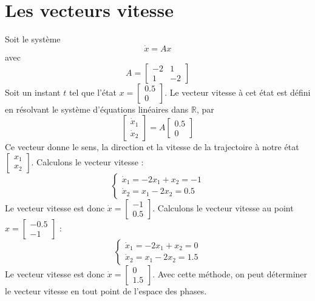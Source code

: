     \section{Les vecteurs vitesse}
        Soit le système
        \begin{equation}
            \dot{x} = A x
        \end{equation}
        avec 
        \begin{equation}
            A = \begin{bmatrix} -2 & 1 \\ 1 & -2 \end{bmatrix}
        \end{equation}
        Soit un instant $t$ tel que l'état $x = \begin{bmatrix} 0.5 \\ 0 \end{bmatrix}$. Le vecteur vitesse à cet état est défini en résolvant le système d'équations linéaires dans $\mathbb R$, par
        \begin{equation}
            \begin{bmatrix} \dot{x}_1 \\ \dot{x}_2 \end{bmatrix} = A \begin{bmatrix} 0.5 \\ 0 \end{bmatrix}
        \end{equation}
        Ce vecteur donne le sens, la direction et la vitesse de la trajectoire à notre état $\begin{bmatrix}x_1\\ x_2\end{bmatrix}$. Calculons le vecteur vitesse :
        \begin{equation}
            \begin{cases}
                \dot{x}_1 = -2x_1 + x_2 = -1\\
                \dot{x}_2 = x_1 - 2x_2 = 0.5
            \end{cases}
        \end{equation}
        Le vecteur vitesse est donc $\dot{x} = \begin{bmatrix} -1\\ 0.5\end{bmatrix} $.
        Calculons le vecteur vitesse au point $x = \begin{bmatrix} -0.5 \\ -1 \end{bmatrix}$ :
        \begin{equation}
            \begin{cases}
                \dot{x}_1 = -2x_1 + x_2 = 0 \\
                \dot{x}_2 = x_1 - 2x_2 = 1.5
            \end{cases}
        \end{equation}
        Le vecteur vitesse est donc $\dot{x} = \begin{bmatrix} 0\\ 1.5\end{bmatrix} $. 
        Avec cette méthode, on peut déterminer le vecteur vitesse en tout point de l'espace des phases. 
        

